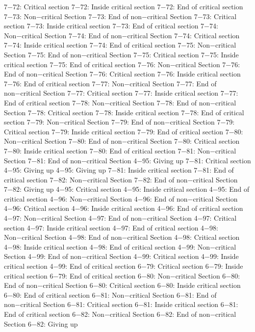 7−72: Critical section
7−72: Inside critical section
7−72: End of critical section
7−73: Non−critical Section
7−73: End of non−critical Section
7−73: Critical section
7−73: Inside critical section
7−73: End of critical section
7−74: Non−critical Section
7−74: End of non−critical Section
7−74: Critical section
7−74: Inside critical section
7−74: End of critical section
7−75: Non−critical Section
7−75: End of non−critical Section
7−75: Critical section
7−75: Inside critical section
7−75: End of critical section
7−76: Non−critical Section
7−76: End of non−critical Section
7−76: Critical section
7−76: Inside critical section
7−76: End of critical section
7−77: Non−critical Section
7−77: End of non−critical Section
7−77: Critical section
7−77: Inside critical section
7−77: End of critical section
7−78: Non−critical Section
7−78: End of non−critical Section
7−78: Critical section
7−78: Inside critical section
7−78: End of critical section
7−79: Non−critical Section
7−79: End of non−critical Section
7−79: Critical section
7−79: Inside critical section
7−79: End of critical section
7−80: Non−critical Section
7−80: End of non−critical Section
7−80: Critical section
7−80: Inside critical section
7−80: End of critical section
7−81: Non−critical Section
7−81: End of non−critical Section
4−95: Giving up
7−81: Critical section
4−95: Giving up
4−95: Giving up
7−81: Inside critical section
7−81: End of critical section
7−82: Non−critical Section
7−82: End of non−critical Section
7−82: Giving up
4−95: Critical section
4−95: Inside critical section
4−95: End of critical section
4−96: Non−critical Section
4−96: End of non−critical Section
4−96: Critical section
4−96: Inside critical section
4−96: End of critical section
4−97: Non−critical Section
4−97: End of non−critical Section
4−97: Critical section
4−97: Inside critical section
4−97: End of critical section
4−98: Non−critical Section
4−98: End of non−critical Section
4−98: Critical section
4−98: Inside critical section
4−98: End of critical section
4−99: Non−critical Section
4−99: End of non−critical Section
4−99: Critical section
4−99: Inside critical section
4−99: End of critical section
6−79: Critical section
6−79: Inside critical section
6−79: End of critical section
6−80: Non−critical Section
6−80: End of non−critical Section
6−80: Critical section
6−80: Inside critical section
6−80: End of critical section
6−81: Non−critical Section
6−81: End of non−critical Section
6−81: Critical section
6−81: Inside critical section
6−81: End of critical section
6−82: Non−critical Section
6−82: End of non−critical Section
6−82: Giving up
